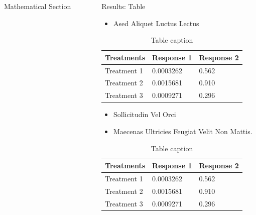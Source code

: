 \documentclass[final,hyperref={pdfpagelabels=false}]{beamer}
\begin{document}
\begin{frame}[t]
\begin{columns}[t]
\begin{column}{.465\textwidth}
\begin{block}{Mathematical Section}
\end{block}


\end{column} %

\begin{column}{.03\textwidth}\end{column} %
 
\begin{column}{.465\textwidth} %


\begin{block}{Results: Table}

\begin{itemize}
\item Ased Aliquet Luctus Lectus
\end{itemize}

\begin{table}
\begin{tabular}{l l l}
\toprule
\textbf{Treatments} & \textbf{Response 1} & \textbf{Response 2}\\
\midrule
Treatment 1 & 0.0003262 & 0.562 \\
Treatment 2 & 0.0015681 & 0.910 \\
Treatment 3 & 0.0009271 & 0.296 \\
\bottomrule
\end{tabular}
\caption{Table caption}
\end{table}

\begin{itemize}
\item Sollicitudin Vel Orci
\item Maecenas Ultricies Feugiat Velit Non Mattis.
\end{itemize}

\begin{table}
\begin{tabular}{l l l}
\toprule
\textbf{Treatments} & \textbf{Response 1} & \textbf{Response 2}\\
\midrule
Treatment 1 & 0.0003262 & 0.562 \\
Treatment 2 & 0.0015681 & 0.910 \\
Treatment 3 & 0.0009271 & 0.296 \\
\bottomrule
\end{tabular}
\caption{Table caption}
\end{table}
     

\end{block}
\end{column}
\end{columns}
\end{frame}
\end{document}
